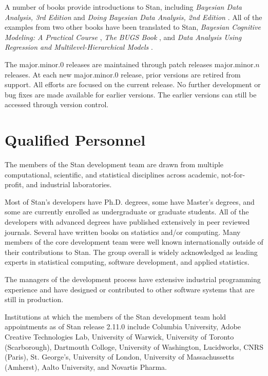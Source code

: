 A number of books provide introductions to Stan, including {\it
  Bayesian Data Analysis, 3rd Edition} \citep{GelmanEtAl:2013} and
{\it Doing Bayesian Data Analysis, 2nd Edition} \citep{Kruschke:2014}.
All of the examples from two other books have been translated to
Stan, {\it Bayesian Cognitive Modeling: A Practical Course}
\citep{LeeWagenmakers:2013}, {\it The BUGS Book}
\citep{LunnEtAl:2012}, and {\it Data Analysis Using Regression and
  Multilevel-Hierarchical Models} \citep{GelmanHill:2007}.

The major.minor.0 releases are maintained through patch releases
major.minor.$n$ releases.  At each new major.minor.0 release, prior
versions are retired from support.  All efforts are focused on the
current release.  No further development or bug fixes are made
available for earlier versions.  The earlier versions can still be
accessed through version control.


\section{Qualified Personnel}

The members of the Stan development team are drawn from multiple
computational, scientific, and statistical disciplines across
academic, not-for-profit, and industrial laboratories. 

Most of Stan's developers have Ph.D. degrees, some have Master's
degrees, and some are currently enrolled as undergraduate or graduate
students. All of the developers with advanced degrees have published
extensively in peer reviewed journals. Several have written books on
statistics and/or computing. Many members of the core development team
were well known internationally outside of their contributions to Stan.
The group overall is widely acknowledged as leading experts in
statistical computing, software development, and applied statistics.

The managers of the development process have extensive industrial
programming experience and have designed or contributed to other
software systems that are still in production.

Institutions at which the members of the Stan development team hold
appointments as of Stan release 2.11.0 include Columbia University,
Adobe Creative Technologies Lab, University of Warwick, University of
Toronto (Scarborough), Dartmouth Colloge, University of Washington,
Lucidworks, CNRS (Paris), St. George's, University of London,
University of Massachussetts (Amherst), Aalto University, and Novartis
Pharma.

